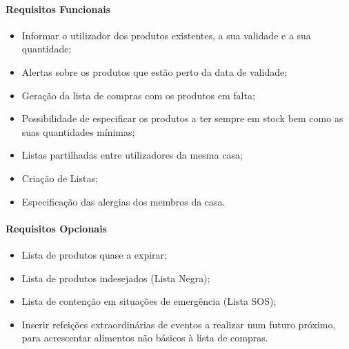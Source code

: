 \paragraph{Requisitos Funcionais}
\begin{itemize}
	\item Informar o utilizador dos produtos existentes, a sua validade e a sua quantidade;
	\item Alertas sobre os produtos que estão perto da data de validade;
	\item Geração da lista de compras com os produtos em falta;
	\item Possibilidade de especificar os produtos a ter sempre em stock bem como as suas quantidades mínimas;
	\item Listas partilhadas entre utilizadores da mesma casa;
	\item Criação de Listas;
	\item Especificação das alergias dos membros da casa.
\end{itemize}


\paragraph{Requisitos Opcionais}
\begin{itemize}
	\item Lista de produtos quase a expirar;
	\item Lista de produtos indesejados (Lista Negra);
	\item Lista de contenção em situações de emergência (Lista SOS);
	\item Inserir refeições extraordinárias de eventos a realizar num futuro próximo, para acrescentar alimentos não básicos à lista de compras.
\end{itemize}